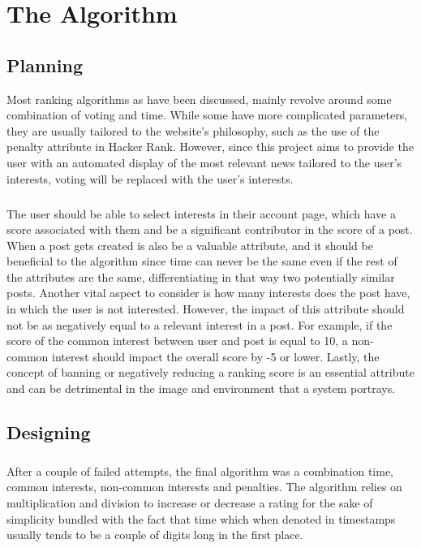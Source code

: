 \chapter {The Algorithm}

\section{Planning}

Most ranking algorithms as have been discussed, mainly revolve around some combination of voting and time. While some have more complicated parameters, they are usually tailored to the website's philosophy, such as the use of  the penalty attribute in Hacker Rank. However, since this project aims to provide the user with an automated display of the most relevant news tailored to the user's interests, voting will be replaced with the user's interests.
\paragraph{}
The user should be able to select interests in their account page, which have a score associated with them and be a significant contributor in the score of a post. When a post gets created is also be a valuable attribute, and it should be beneficial to the algorithm since time can never be the same even if the rest of the attributes are the same, differentiating in that way two potentially similar posts. Another vital aspect to consider is how many interests does the post have, in which the user is not interested. However, the impact of this attribute should not be as negatively equal to a relevant interest in a post. For example, if the score of the common interest between user and post is equal to 10, a non-common interest should impact the overall score by -5 or lower. Lastly, the concept of banning or negatively reducing a ranking score is an essential attribute and can be detrimental in the image and environment that a system portrays.

\section {Designing}

\paragraph{}

After a couple of failed attempts, the final algorithm was a combination time, common interests, non-common interests and penalties. The algorithm relies on multiplication and division to increase or decrease a rating for the sake of simplicity bundled with the fact that time which when denoted in timestamps usually tends to be a couple of digits long in the first place.

